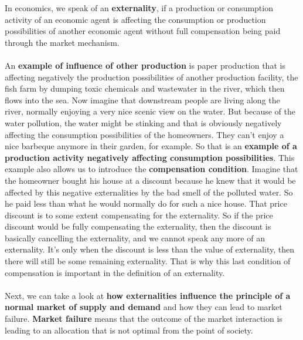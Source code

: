 \documentclass[../summary.tex]{subfiles}
\begin{document}
	  In economics, we speak of an \textbf{externality}, if a production or consumption activity of an economic agent is affecting the consumption or production possibilities of another economic agent without full compensation being paid through the market mechanism. 
	  \\\\
	  An \textbf{example of influence of other production} is paper production that is affecting negatively the production possibilities of another production facility, the fish farm by dumping toxic chemicals and wastewater in the river, which then flows into the sea. Now imagine that downstream people are living along the river, normally enjoying a very nice scenic view on the water. But because of the water pollution, the water might be stinking and that is obviously negatively affecting the consumption possibilities of the homeowners. They can't enjoy a nice barbeque anymore in their garden, for example. So that is an \textbf{example of a production activity negatively affecting consumption possibilities}. This example also allows us to introduce the \textbf{compensation condition}.  Imagine that the homeowner bought his house at a discount because he knew that it would be affected by this negative externalities by the bad smell of the polluted water. So he paid less than what he would normally do for such a nice house. That price discount is to some extent compensating for the externality. So if the price discount would be fully compensating the externality, then the discount is basically cancelling the externality, and we cannot speak any more of an externality. It's only when the discount is less than the value of externality, then there will still be some remaining externality. That is why this last condition of compensation is important in the definition of an externality.
	  \\\\
	  Next, we can take a look at \textbf{how externalities influence the principle of a normal market of supply and demand} and how they can lead to market failure. \textbf{Market failure} means that the outcome of the market interaction is leading to an allocation that is not optimal from the point of society.
	  \\\\
\end{document}
